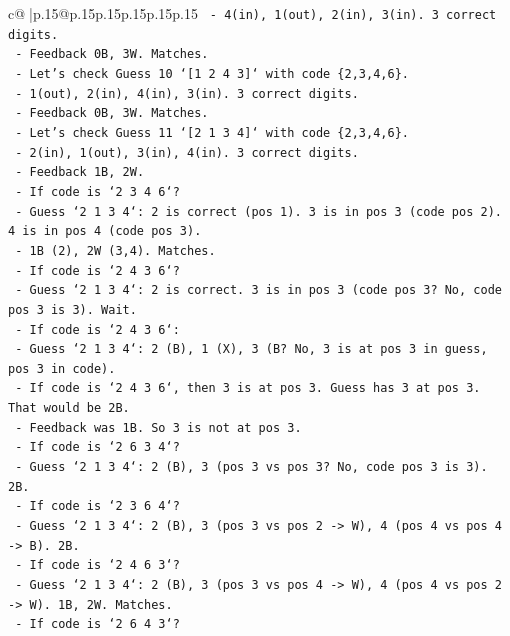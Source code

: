 \documentclass{article}
\begin{document}
{\begin{supertabular}{c@{$\;$}|p{.15\linewidth}@{}p{.15\linewidth}p{.15\linewidth}p{.15\linewidth}p{.15\linewidth}p{.15\linewidth}}
{{{\texttt{      {-} 4(in), 1(out), 2(in), 3(in). 3 correct digits.} \\
\texttt{      {-} Feedback 0B, 3W. Matches.} \\
\texttt{    {-} Let's check Guess 10 `{[}1 2 4 3{]}` with code \{2,3,4,6\}.} \\
\texttt{      {-} 1(out), 2(in), 4(in), 3(in). 3 correct digits.} \\
\texttt{      {-} Feedback 0B, 3W. Matches.} \\
\texttt{    {-} Let's check Guess 11 `{[}2 1 3 4{]}` with code \{2,3,4,6\}.} \\
\texttt{      {-} 2(in), 1(out), 3(in), 4(in). 3 correct digits.} \\
\texttt{      {-} Feedback 1B, 2W.} \\
\texttt{      {-} If code is `2 3 4 6`?} \\
\texttt{        {-} Guess `2 1 3 4`: 2 is correct (pos 1). 3 is in pos 3 (code pos 2). 4 is in pos 4 (code pos 3).} \\
\texttt{        {-} 1B (2), 2W (3,4). Matches.} \\
\texttt{      {-} If code is `2 4 3 6`?} \\
\texttt{        {-} Guess `2 1 3 4`: 2 is correct. 3 is in pos 3 (code pos 3? No, code pos 3 is 3). Wait.} \\
\texttt{        {-} If code is `2 4 3 6`:} \\
\texttt{          {-} Guess `2 1 3 4`: 2 (B), 1 (X), 3 (B? No, 3 is at pos 3 in guess, pos 3 in code).} \\
\texttt{          {-} If code is `2 4 3 6`, then 3 is at pos 3. Guess has 3 at pos 3. That would be 2B.} \\
\texttt{          {-} Feedback was 1B. So 3 is not at pos 3.} \\
\texttt{      {-} If code is `2 6 3 4`?} \\
\texttt{        {-} Guess `2 1 3 4`: 2 (B), 3 (pos 3 vs pos 3? No, code pos 3 is 3). 2B.} \\
\texttt{      {-} If code is `2 3 6 4`?} \\
\texttt{        {-} Guess `2 1 3 4`: 2 (B), 3 (pos 3 vs pos 2 {-}> W), 4 (pos 4 vs pos 4 {-}> B). 2B.} \\
\texttt{      {-} If code is `2 4 6 3`?} \\
\texttt{        {-} Guess `2 1 3 4`: 2 (B), 3 (pos 3 vs pos 4 {-}> W), 4 (pos 4 vs pos 2 {-}> W). 1B, 2W. Matches.} \\
\texttt{      {-} If code is `2 6 4 3`?} \\
}}}
\end{supertabular}}
\end{document}
